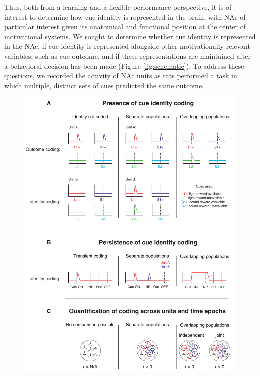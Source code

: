 \documentclass[11pt]{article}
\providecommand{\DIFadd}[1]{{\protect\color{red} \sf #1}} %
\providecommand{\DIFdel}[1]{} %
\providecommand{\DIFaddbegin}{} %
\providecommand{\DIFaddend}{} %
\providecommand{\DIFdelbegin}{} %
\providecommand{\DIFdelend}{} %
\newcommand{\DIFscaledelfig}{0.5}
\newlength{\DIFdelgraphicswidth} %
\newlength{\DIFdelgraphicsheight} %
\newcommand{\DIFaddincludegraphics}[2][]{{\color{red}\fbox{\DIFOincludegraphics[#1]{#2}}}} %
\newcommand{\DIFdelincludegraphics}[2][]{%
\sbox{\DIFdelgraphicsbox}{\DIFOincludegraphics[#1]{#2}}%
\settoboxwidth{\DIFdelgraphicswidth}{\DIFdelgraphicsbox} %
\settoboxtotalheight{\DIFdelgraphicsheight}{\DIFdelgraphicsbox} %
\scalebox{\DIFscaledelfig}{%
\parbox[b]{\DIFdelgraphicswidth}{\usebox{\DIFdelgraphicsbox}\\[-\baselineskip] \rule{\DIFdelgraphicswidth}{0em}}\llap{\resizebox{\DIFdelgraphicswidth}{\DIFdelgraphicsheight}{%
\setlength{\unitlength}{\DIFdelgraphicswidth}%
\begin{picture}(1,1)%
\thicklines\linethickness{2pt} %
{\color[rgb]{1,0,0}\put(0,0){\framebox(1,1){}}}%
{\color[rgb]{1,0,0}\put(0,0){\line( 1,1){1}}}%
{\color[rgb]{1,0,0}\put(0,1){\line(1,-1){1}}}%
\end{picture}%
}\hspace*{3pt}}} %
} %
\DeclareRobustCommand{\DIFaddbegin}{\DIFOaddbegin \let\includegraphics\DIFaddincludegraphics} %
\DeclareRobustCommand{\DIFaddend}{\DIFOaddend \let\includegraphics\DIFOincludegraphics} %
\DeclareRobustCommand{\DIFdelbegin}{\DIFOdelbegin \let\includegraphics\DIFdelincludegraphics} %
\DeclareRobustCommand{\DIFdelend}{\DIFOaddend \let\includegraphics\DIFOincludegraphics} %
\begin{document}
Thus, both from a learning and a flexible performance perspective, it
is of interest to determine how cue identity is represented in the
brain, with NAc of particular interest given its anatomical and
functional position at the center of motivational systems. We sought
to determine whether cue identity is represented in the NAc, if cue
identity is represented alongside other motivationally relevant
variables, such as cue \DIFdelbegin \DIFdel{value}\DIFdelend \DIFaddbegin \DIFadd{outcome}\DIFaddend , and if these representations are
maintained after a behavioral decision has been made (Figure
\ref{fig:schematic}). To address these questions, we recorded the
activity of NAc units as rats performed a task in which multiple,
distinct sets of cues predicted the same outcome.


 \begin{figure}[ht!]
\centering
 \includegraphics[height=0.7\textheight]{Fig 1 - Schematic neural.pdf}

\end{figure}
\end{document}
